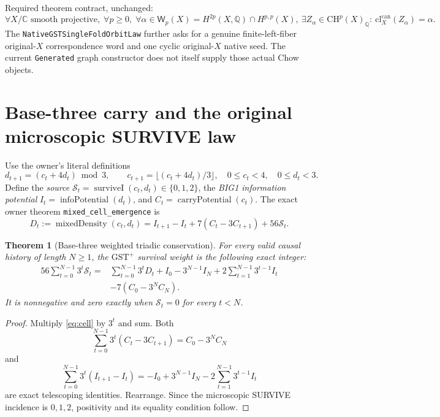 \documentclass[11pt]{article}
\newtheorem{theorem}{Theorem}[section]
\newcommand{\Q}{\mathbb Q}
\newcommand{\C}{\mathbb C}
\newcommand{\W}{\mathsf W}
\newcommand{\cl}{\mathrm{cl}}
\newcommand{\CH}{\mathrm{CH}}
\begin{document}
Required theorem contract, unchanged:
\[
\forall X/\C\text{ smooth projective},\;\forall p\ge0,\;
\forall\alpha\in\W_p(X)=H^{2p}(X,\Q)\cap H^{p,p}(X),\
\exists Z_\alpha\in\CH^p(X)_\Q:\ \cl_X^{\mathrm{can}}(Z_\alpha)=\alpha.
\]
The \texttt{NativeGSTSingleFoldOrbitLaw} further asks for a genuine
finite-left-fiber original-\(X\) correspondence word and one
cyclic original-\(X\) native seed. The current \texttt{Generated} graph
constructor does not itself supply those actual Chow objects.

\section{Base-three carry and the original microscopic SURVIVE law}

Use the owner's literal definitions
\[
 d_{t+1}=(c_t+4d_t)\bmod3,\qquad
 c_{t+1}=\lfloor(c_t+4d_t)/3\rfloor,
 \quad 0\le c_t<4,\quad 0\le d_t<3.
\]
Define the \emph{source} \(\mathcal S_t=\operatorname{surviveI}(c_t,d_t)\in\{0,1,2\}\),
the \emph{BIG1 information potential}
\(I_t=\operatorname{infoPotential}(d_t)\), and
\(C_t=\operatorname{carryPotential}(c_t)\).
The exact owner theorem \texttt{mixed\_cell\_emergence} is
\begin{equation}\label{eq:cell}
D_t:=\operatorname{mixedDensity}(c_t,d_t)
=I_{t+1}-I_t+7(C_t-3C_{t+1})+56\mathcal S_t.
\end{equation}

\begin{theorem}[Base-three weighted triadic conservation]\label{th:weighted}
For \emph{every} valid causal history of length \(N\ge1\), the
\(\mathrm{GST}^{+}\) survival weight is the following exact integer:
\begin{align}\label{eq:weighted}
56\sum_{t=0}^{N-1}3^t\mathcal S_t
={}&\sum_{t=0}^{N-1}3^tD_t
+I_0-3^{N-1}I_N
+2\sum_{t=1}^{N-1}3^{t-1}I_t\nonumber\\
&-7(C_0-3^NC_N).
\end{align}
It is nonnegative and zero exactly when \(\mathcal S_t=0\)
for every \(t<N\).
\end{theorem}
\begin{proof}
Multiply \eqref{eq:cell} by \(3^t\) and sum. Both
\[
\sum_{t=0}^{N-1}3^t(C_t-3C_{t+1})=C_0-3^NC_N
\]
and
\[
\sum_{t=0}^{N-1}3^t(I_{t+1}-I_t)
=-I_0+3^{N-1}I_N-2\sum_{t=1}^{N-1}3^{t-1}I_t
\]
are exact telescoping identities. Rearrange.
Since the microscopic SURVIVE incidence is \(0,1,2\),
positivity and its equality condition follow.
\end{proof}
\end{document}
